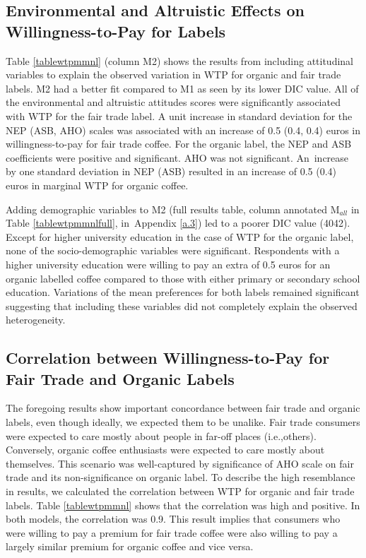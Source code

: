 \documentclass[sustainability,article,accept,moreauthors,pdftex,10pt,a4paper]{Definitions/mdpi}
\theoremstyle{mdpi}
\newcounter{ex}
\newcounter{re}
\theoremstyle{mdpidefinition}
\begin{document}
{\subsection{Environmental and Altruistic Effects on Willingness-to-Pay for Labels}\label{attsonlabs}
\par{Table \ref{tablewtpmmnl} (column M2) shows the results from including attitudinal variables to explain the observed variation in WTP for organic and fair trade labels. M2 had a better fit compared to M1 as seen by its lower DIC value. All of the environmental and altruistic attitudes scores were significantly associated with WTP for the fair trade label. A unit increase in standard deviation for the NEP (ASB, AHO) scales was associated with an increase of 0.5 (0.4, 0.4) euros in willingness-to-pay for fair trade coffee. For the organic label, the NEP and ASB coefficients were positive and significant. AHO was not significant. An~increase by one standard deviation in NEP (ASB) resulted in an increase of 0.5 (0.4) euros in marginal WTP for organic coffee. }

\par{Adding demographic variables to M2 (full results table, column annotated M$_{all}$ in Table \ref{tablewtpmmnlfull}, in~Appendix \ref{a.3}) %
led to a poorer DIC value (4042). Except for higher university education in the case of WTP for the organic label, none of the socio-demographic variables were significant. Respondents with a higher university education were willing to pay an extra of 0.5 euros for an organic labelled coffee compared to those with either primary or secondary school education. Variations of the mean preferences for both labels remained significant suggesting that including these variables did not completely explain the observed heterogeneity.}


\subsection{Correlation between Willingness-to-Pay for Fair Trade and Organic Labels}\label{ftradebioassociation}
\par{The foregoing results show important concordance between fair trade and organic labels, even though ideally, we expected them to be unalike. Fair trade consumers were expected to care mostly about people in far-off places (i.e.,\hspace{1mm}others). Conversely, organic coffee enthusiasts were expected to care mostly about themselves. This scenario was well-captured by significance of AHO scale on fair trade and its non-significance on organic label. To describe the high resemblance in results, we calculated the correlation between WTP for organic and fair trade labels. Table \ref{tablewtpmmnl} shows that the correlation was high and positive. In both models, the correlation was 0.9. This result implies that consumers who were willing to pay a premium for fair trade coffee were also willing to pay a largely similar premium for organic coffee and vice versa.}

}
\end{document}
